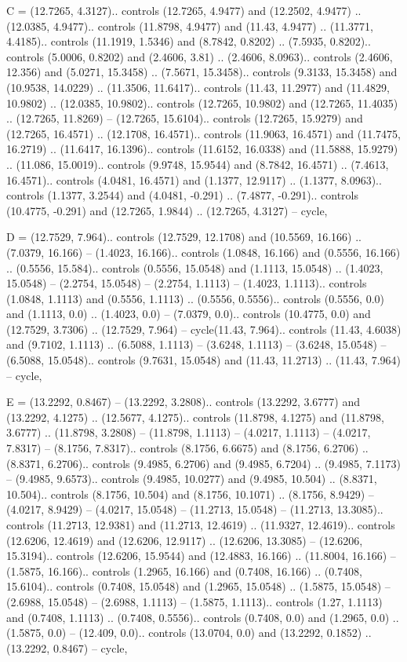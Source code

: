 C = {(12.7265, 4.3127).. controls (12.7265, 4.9477) and (12.2502, 4.9477) .. (12.0385, 4.9477).. controls (11.8798, 4.9477) and (11.43, 4.9477) .. (11.3771, 4.4185).. controls (11.1919, 1.5346) and (8.7842, 0.8202) .. (7.5935, 0.8202).. controls (5.0006, 0.8202) and (2.4606, 3.81) .. (2.4606, 8.0963).. controls (2.4606, 12.356) and (5.0271, 15.3458) .. (7.5671, 15.3458).. controls (9.3133, 15.3458) and (10.9538, 14.0229) .. (11.3506, 11.6417).. controls (11.43, 11.2977) and (11.4829, 10.9802) .. (12.0385, 10.9802).. controls (12.7265, 10.9802) and (12.7265, 11.4035) .. (12.7265, 11.8269) -- (12.7265, 15.6104).. controls (12.7265, 15.9279) and (12.7265, 16.4571) .. (12.1708, 16.4571).. controls (11.9063, 16.4571) and (11.7475, 16.2719) .. (11.6417, 16.1396).. controls (11.6152, 16.0338) and (11.5888, 15.9279) .. (11.086, 15.0019).. controls (9.9748, 15.9544) and (8.7842, 16.4571) .. (7.4613, 16.4571).. controls (4.0481, 16.4571) and (1.1377, 12.9117) .. (1.1377, 8.0963).. controls (1.1377, 3.2544) and (4.0481, -0.291) .. (7.4877, -0.291).. controls (10.4775, -0.291) and (12.7265, 1.9844) .. (12.7265, 4.3127) -- cycle},

D = {(12.7529, 7.964).. controls (12.7529, 12.1708) and (10.5569, 16.166) .. (7.0379, 16.166) -- (1.4023, 16.166).. controls (1.0848, 16.166) and (0.5556, 16.166) .. (0.5556, 15.584).. controls (0.5556, 15.0548) and (1.1113, 15.0548) .. (1.4023, 15.0548) -- (2.2754, 15.0548) -- (2.2754, 1.1113) -- (1.4023, 1.1113).. controls (1.0848, 1.1113) and (0.5556, 1.1113) .. (0.5556, 0.5556).. controls (0.5556, 0.0) and (1.1113, 0.0) .. (1.4023, 0.0) -- (7.0379, 0.0).. controls (10.4775, 0.0) and (12.7529, 3.7306) .. (12.7529, 7.964) -- cycle(11.43, 7.964).. controls (11.43, 4.6038) and (9.7102, 1.1113) .. (6.5088, 1.1113) -- (3.6248, 1.1113) -- (3.6248, 15.0548) -- (6.5088, 15.0548).. controls (9.7631, 15.0548) and (11.43, 11.2713) .. (11.43, 7.964) -- cycle},

E = {(13.2292, 0.8467) -- (13.2292, 3.2808).. controls (13.2292, 3.6777) and (13.2292, 4.1275) .. (12.5677, 4.1275).. controls (11.8798, 4.1275) and (11.8798, 3.6777) .. (11.8798, 3.2808) -- (11.8798, 1.1113) -- (4.0217, 1.1113) -- (4.0217, 7.8317) -- (8.1756, 7.8317).. controls (8.1756, 6.6675) and (8.1756, 6.2706) .. (8.8371, 6.2706).. controls (9.4985, 6.2706) and (9.4985, 6.7204) .. (9.4985, 7.1173) -- (9.4985, 9.6573).. controls (9.4985, 10.0277) and (9.4985, 10.504) .. (8.8371, 10.504).. controls (8.1756, 10.504) and (8.1756, 10.1071) .. (8.1756, 8.9429) -- (4.0217, 8.9429) -- (4.0217, 15.0548) -- (11.2713, 15.0548) -- (11.2713, 13.3085).. controls (11.2713, 12.9381) and (11.2713, 12.4619) .. (11.9327, 12.4619).. controls (12.6206, 12.4619) and (12.6206, 12.9117) .. (12.6206, 13.3085) -- (12.6206, 15.3194).. controls (12.6206, 15.9544) and (12.4883, 16.166) .. (11.8004, 16.166) -- (1.5875, 16.166).. controls (1.2965, 16.166) and (0.7408, 16.166) .. (0.7408, 15.6104).. controls (0.7408, 15.0548) and (1.2965, 15.0548) .. (1.5875, 15.0548) -- (2.6988, 15.0548) -- (2.6988, 1.1113) -- (1.5875, 1.1113).. controls (1.27, 1.1113) and (0.7408, 1.1113) .. (0.7408, 0.5556).. controls (0.7408, 0.0) and (1.2965, 0.0) .. (1.5875, 0.0) -- (12.409, 0.0).. controls (13.0704, 0.0) and (13.2292, 0.1852) .. (13.2292, 0.8467) -- cycle},

